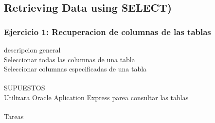 \documentclass[12pt,letterpaper]{article}
\begin{document}
\newpage
\subsection{Retrieving Data using SELECT)}
\subsubsection{Ejercicio 1: Recuperacion de columnas de las tablas} 
descripcion general  \\
Seleccionar todas las columnas de una tabla\\
Seleccionar columnas especificadas de una tabla\\
\\
SUPUESTOS \\
Utilizara Oracle Aplication Express parea consultar las tablas\\
\\Tareas
\end{document}
